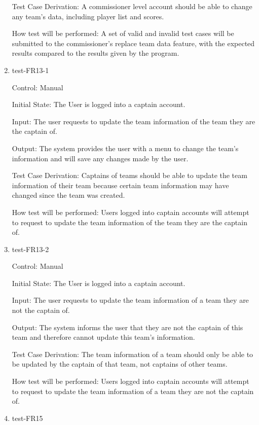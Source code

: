 \documentclass[12pt, titlepage]{article}
\begin{document}
\begin{enumerate}
  Test Case Derivation: A commissioner level account should be able to change
  any team's data, including player list and scores.

  How test will be performed: A set of valid and invalid test cases will be
  submitted to the commissioner's replace team data feature, with the expected
  results compared to the results given by the program.

  \item{test-FR13-1\\}

  Control: Manual

  Initial State: The User is logged into a captain account.

  Input: The user requests to update the team information of the team they are
  the captain of.

  Output: The system provides the user with a menu to change the team's
  information and will save any changes made by the user.

  Test Case Derivation: Captains of teams should be able to update the team
  information of their team because certain team information may have changed
  since the team was created.

  How test will be performed: Users logged into captain accounts will attempt
  to request to update the team information of the team they are the captain of.

  \item{test-FR13-2\\}

  Control: Manual

  Initial State: The User is logged into a captain account.

  Input: The user requests to update the team information of a team they are
  not the captain of.

  Output: The system informs the user that they are not the captain of this team
  and therefore cannot update this team's information.

  Test Case Derivation: The team information of a team should only be able to be
  updated by the captain of that team, not captains of other teams.

  How test will be performed: Users logged into captain accounts will attempt
  to request to update the team information of a team they are not the captain
  of.

  \item{test-FR15\\}


\end{enumerate}
\end{document}
